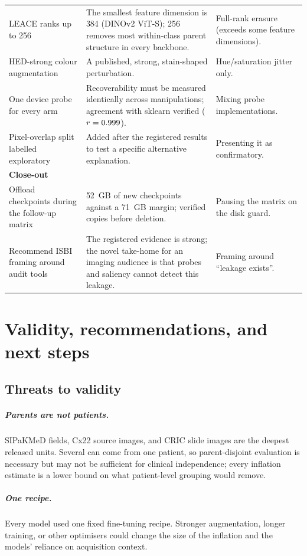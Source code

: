 {\begin{longtable}{p{}p{}p{}}
LEACE ranks up to 256 & The smallest feature dimension is 384 (DINOv2 ViT-S); 256 removes most within-class parent structure in every backbone. & Full-rank erasure (exceeds some feature dimensions). \\
HED-strong colour augmentation & A published, strong, stain-shaped perturbation. & Hue/saturation jitter only. \\
One device probe for every arm & Recoverability must be measured identically across manipulations; agreement with sklearn verified ($r=0.999$). & Mixing probe implementations. \\
Pixel-overlap split labelled exploratory & Added after the registered results to test a specific alternative explanation. & Presenting it as confirmatory. \\
\multicolumn{3}{l}{\textbf{Close-out}} \\
Offload checkpoints during the follow-up matrix & 52~GB of new checkpoints against a 71~GB margin; verified copies before deletion. & Pausing the matrix on the disk guard. \\
Recommend ISBI framing around audit tools & The registered evidence is strong; the novel take-home for an imaging audience is that probes and saliency cannot detect this leakage. & Framing around ``leakage exists''. \\
\end{longtable}
}

\chapter{Validity, recommendations, and next steps}
\label{r:ch:validity}

\section{Threats to validity}

\paragraph{Parents are not patients.} SIPaKMeD fields, Cx22 source images, and CRIC slide images are the deepest released
units. Several can come from one patient, so parent-disjoint evaluation is necessary but may not be sufficient for
clinical independence; every inflation estimate is a lower bound on what patient-level grouping would remove.

\paragraph{One recipe.} Every model used one fixed fine-tuning recipe. Stronger augmentation, longer training, or other
optimisers could change the size of the inflation and the models' reliance on acquisition context.

